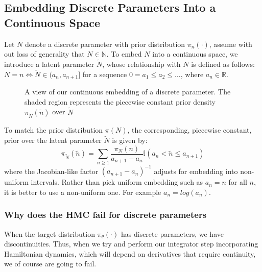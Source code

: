 \documentclass[]{report}
\begin{document}
\subsection{Embedding Discrete Parameters Into a Continuous Space}

Let $N$ denote a discrete parameter with prior distribution $\pi_{n}(\cdot)$, assume with out loss of generality that $N \in \mathbb{N}$. To embed $N$ into a continuous space, we introduce
a latent parameter $\tilde{N}$, whose relationship with $N$ is defined as follows: $N = n \iff \tilde{N}\in(a_{n}, a_{n+1}] $ for a sequence $0 = a_{1} \leq a_{2} \leq \ldots$, where $a_{n} \in \mathbb{R}$. \\
\begin{figure}[h!]
	\centering
{}
\caption{A view of our continuous embedding of a discrete parameter. The shaded region represents the piecewise constant prior density $\pi_{\tilde{N}}(\tilde{n})$ over $\tilde{N}$}\label{fig:contembedding}
\end{figure}
To match the prior distribution $\pi(N)$, the corresponding, piecewise constant, prior over the latent parameter $\tilde{N}$ is given by: \begin{equation}
\pi_{\tilde{N}}(\tilde{n}) = \sum_{n \geq 1} \frac{\pi_{N}(n)}{a_{n+1} - a_{n}} \mathbb{I}(a_{n} < \tilde{n} \leq a_{n+1}) 
\end{equation}
where the Jacobian-like factor $(a_{n+1} - a_{n})^{-1}$ adjusts for embedding into non-uniform intervals. Rather than pick uniform embedding such as $a_{n} = n$ for all $n$, it is better to use a non-uniform one. For example $a_{n} = log(a_{n})$.

\subsubsection{Why does the HMC fail for discrete parameters}
When the target distribution $\pi_{\theta}(\cdot)$ has discrete parameters, we have discontinuities. Thus, when we try and perform our integrator step incorporating Hamiltonian dynamics, 
which will depend on derivatives that require continuity, we of course are going to fail.
\end{document}
